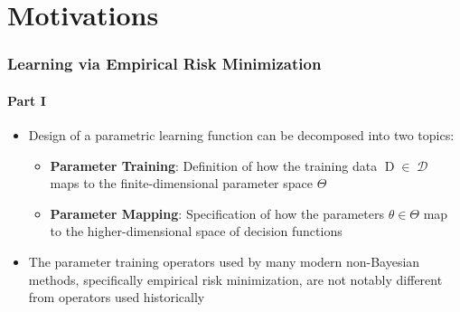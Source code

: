 \documentclass[aspectratio=169,usenames,dvipsnames]{beamer}
\DeclareMathOperator{\Drm}{\mathrm{D}}
\DeclareMathOperator{\Dcal}{\mathcal{D}}
\begin{document}
\section{Motivations}


\begin{frame}
\frametitle{Learning via Empirical Risk Minimization}
\framesubtitle{Part I}

\begin{itemize}
\item Design of a parametric learning function can be decomposed into two topics:
	\vspace{0.25em}
	\begin{itemize}
	\item \textbf{Parameter Training}: Definition of how the training data $\Drm \in \Dcal$ maps to the finite-dimensional parameter space $\Theta$
	\vspace{0.25em}
	\item \textbf{Parameter Mapping}: Specification of how the parameters $\theta \in \Theta$ map to the higher-dimensional space of decision functions 
	\end{itemize}
\vspace{0.5em}
\item The parameter training operators used by many modern non-Bayesian methods, specifically \alert{empirical risk minimization}, are not notably different from operators used historically

\end{itemize}

\vspace{1em}
\centering
{}

\end{frame}
\end{document}
